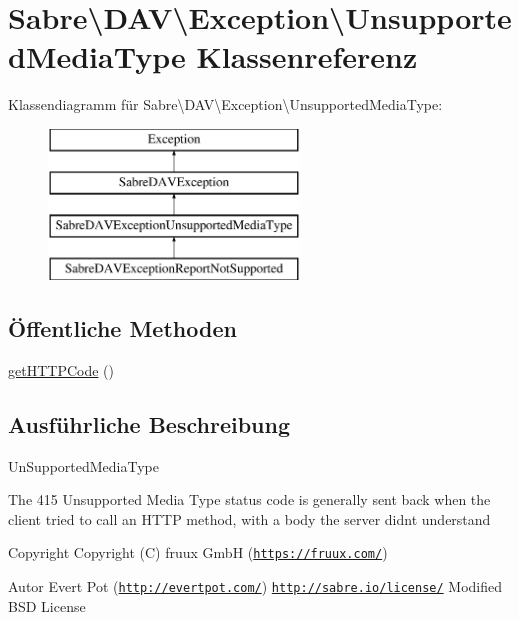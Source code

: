 \hypertarget{class_sabre_1_1_d_a_v_1_1_exception_1_1_unsupported_media_type}{}\section{Sabre\textbackslash{}D\+AV\textbackslash{}Exception\textbackslash{}Unsupported\+Media\+Type Klassenreferenz}
\label{class_sabre_1_1_d_a_v_1_1_exception_1_1_unsupported_media_type}
Klassendiagramm für Sabre\textbackslash{}D\+AV\textbackslash{}Exception\textbackslash{}Unsupported\+Media\+Type\+:\begin{figure}[H]
\begin{center}
\leavevmode
\includegraphics[height=4.000000cm]{class_sabre_1_1_d_a_v_1_1_exception_1_1_unsupported_media_type}
\end{center}
\end{figure}
\subsection*{Öffentliche Methoden}
\begin{DoxyCompactItemize}
\item 
\mbox{\hyperlink{class_sabre_1_1_d_a_v_1_1_exception_1_1_unsupported_media_type_a01f8e84771e8b084107921ed18a36b50}{get\+H\+T\+T\+P\+Code}} ()
\end{DoxyCompactItemize}


\subsection{Ausführliche Beschreibung}
Un\+Supported\+Media\+Type

The 415 Unsupported Media Type status code is generally sent back when the client tried to call an H\+T\+TP method, with a body the server didn\textquotesingle{}t understand

\begin{DoxyCopyright}{Copyright}
Copyright (C) fruux GmbH (\href{https://fruux.com/}{\tt https\+://fruux.\+com/}) 
\end{DoxyCopyright}
\begin{DoxyAuthor}{Autor}
Evert Pot (\href{http://evertpot.com/}{\tt http\+://evertpot.\+com/})  \href{http://sabre.io/license/}{\tt http\+://sabre.\+io/license/} Modified B\+SD License 
\end{DoxyAuthor}


